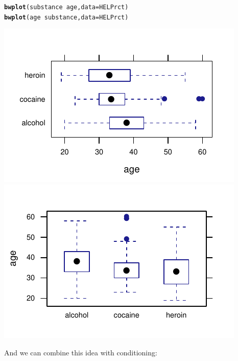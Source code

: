 \documentclass[twoside]{book}\usepackage[]{graphicx}\usepackage[]{xcolor}
\makeatletter
\def\maxwidth{ %
  \ifdim\Gin@nat@width>\linewidth
    \linewidth
  \else
    \Gin@nat@width
  \fi
}
\newcommand{\hlopt}[1]{\textcolor[rgb]{0,0,0}{#1}}%
\newcommand{\hlstd}[1]{\textcolor[rgb]{0.345,0.345,0.345}{#1}}%
\newcommand{\hlkwc}[1]{\textcolor[rgb]{0.333,0.667,0.333}{#1}}%
\newcommand{\hlkwd}[1]{\textcolor[rgb]{0.737,0.353,0.396}{\textbf{#1}}}%
\newenvironment{kframe}{%
 \def\at@end@of@kframe{}%
 \ifinner\ifhmode%
  \def\at@end@of@kframe{\end{minipage}}%
  \begin{minipage}{\columnwidth}%
 \fi\fi%
 \def\FrameCommand##1{\hskip\@totalleftmargin \hskip-\fboxsep
 \colorbox{shadecolor}{##1}\hskip-\fboxsep
     \hskip-\linewidth \hskip-\@totalleftmargin \hskip\columnwidth}%
 \MakeFramed {\advance\hsize-\width
   \@totalleftmargin\z@ \linewidth\hsize
   \@setminipage}}%
 {\par\unskip\endMakeFramed%
 \at@end@of@kframe}
\newenvironment{knitrout}{}{} %
\makeatother
\begin{document}
\begin{knitrout}
\color{fgcolor}\begin{kframe}
\begin{alltt}
\hlkwd{bwplot}\hlstd{(substance} \hlopt{~} \hlstd{age,} \hlkwc{data}\hlstd{=HELPrct)}
\hlkwd{bwplot}\hlstd{(age} \hlopt{~} \hlstd{substance,} \hlkwc{data}\hlstd{=HELPrct)}
\end{alltt}
\end{kframe}

{\centering \includegraphics[width=\maxwidth]{figures/fig-bwplot2-1} 
\includegraphics[width=\maxwidth]{figures/fig-bwplot2-2} 

}



\end{knitrout}
And we can combine this idea with conditioning:
\end{document}

